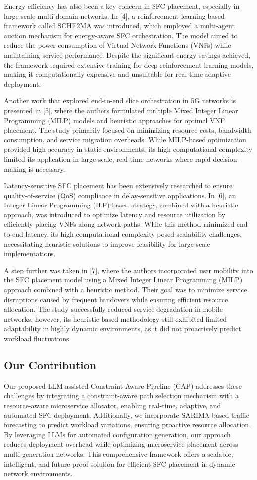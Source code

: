 \documentclass[conference]{IEEEtran}
\begin{document}
	Energy efficiency has also been a key concern in SFC placement, especially in large-scale multi-domain networks. In [4], a reinforcement learning-based framework called SCHE2MA was introduced, which employed a multi-agent auction mechanism for energy-aware SFC orchestration. The model aimed to reduce the power consumption of Virtual Network Functions (VNFs) while maintaining service performance. Despite the significant energy savings achieved, the framework required extensive training for deep reinforcement learning models, making it computationally expensive and unsuitable for real-time adaptive deployment.
	
	Another work that explored end-to-end slice orchestration in 5G networks is presented in [5], where the authors formulated multiple Mixed Integer Linear Programming (MILP) models and heuristic approaches for optimal VNF placement. The study primarily focused on minimizing resource costs, bandwidth consumption, and service migration overheads. While MILP-based optimization provided high accuracy in static environments, its high computational complexity limited its application in large-scale, real-time networks where rapid decision-making is necessary.
	
	Latency-sensitive SFC placement has been extensively researched to ensure quality-of-service (QoS) compliance in delay-sensitive applications. In [6], an Integer Linear Programming (ILP)-based strategy, combined with a heuristic approach, was introduced to optimize latency and resource utilization by efficiently placing VNFs along network paths. While this method minimized end-to-end latency, its high computational complexity posed scalability challenges, necessitating heuristic solutions to improve feasibility for large-scale implementations.	
	
	A step further was taken in [7], where the authors incorporated user mobility into the SFC placement model using a Mixed Integer Linear Programming (MILP) approach combined with a heuristic method. Their goal was to minimize service disruptions caused by frequent handovers while ensuring efficient resource allocation. The study successfully reduced service degradation in mobile networks; however, its heuristic-based methodology still exhibited limited adaptability in highly dynamic environments, as it did not proactively predict workload fluctuations.
	
	\subsection{Our Contribution}
	Our proposed LLM-assisted Constraint-Aware Pipeline (CAP) addresses these challenges by integrating a constraint-aware path selection mechanism with a resource-aware microservice allocator, enabling real-time, adaptive, and automated SFC deployment. Additionally, we incorporate SARIMA-based traffic forecasting to predict workload variations, ensuring proactive resource allocation. By leveraging LLMs for automated configuration generation, our approach reduces deployment overhead while optimizing microservice placement across multi-generation networks. This comprehensive framework offers a scalable, intelligent, and future-proof solution for efficient SFC placement in dynamic network environments.
	
\end{document}
